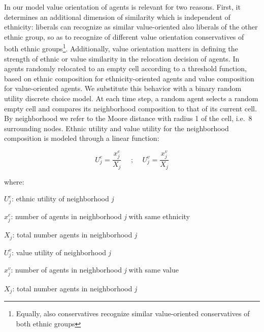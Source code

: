 \documentclass[
]{article}
\begin{document}
In our model value orientation of agents is relevant for two reasons.
First, it determines an additional dimension of similarity which is
independent of ethnicity: liberals can recognize as similar
value-oriented also liberals of the other ethnic group, so as to
recognize of different value orientation conservatives of both ethnic
groups\footnote{Equally, also conservatives recognize similar value-oriented conservatives of both ethnic groups}.
Additionally, value orientation matters in defining the strength of
ethnic or value similarity in the relocation decision of agents. In
\cite{paolillo2018} agents randomly relocated to an empty cell according
to a threshold function, based on ethnic composition for
ethnicity-oriented agents and value composition for value-oriented
agents. We substitute this behavior with a binary random utility
discrete choice model. At each time step, a random agent selects a
random empty cell and compares its neighborhood composition to that of
its current cell. By neighborhood we refer to the Moore distance with
radius 1 of the cell, i.e.~8 surrounding nodes. Ethnic utility and value
utility for the neighborhood composition is modeled through a linear
function:

\begin{equation}
   U^e_j = \frac{x^e_j}{X_j}\quad\text{   ;    }\quad  U^v_j = \frac{x^v_j}{X_j}
\end{equation}

where:

\par

\(U^e_j\): ethnic utility of neighborhood \textit{j}

\par

\(x^e_j\): number of agents in neighborhood \textit{j} with same
ethnicity

\par

\(X_j\): total number agents in neighborhood \textit{j}

\par

\(U^v_j\): value utility of neighborhood \textit{j}

\par

\(x^v_j\): number of agents in neighborhood \textit{j} with same value

\par

\(X_j\): total number agents in neighborhood \textit{j}
\end{document}
